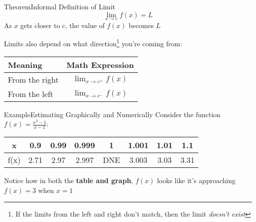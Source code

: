 \documentclass{MathNotes}
\newenvironment{example}[1]{\begin{BlueBox}{Example}{#1}}{\end{BlueBox}}
\newenvironment{theorem}[1]{\begin{GrayBox}{Theorem}{#1}}{\end{GrayBox}}
\begin{document}
\begin{multicols}{2}[]
\begin{theorem}{Informal Definition of Limit}
    \[\lim_{x\to c}f(x)=L\] 
    As $x$ gets closer to $c$, the value of $f(x)$ becomes $L$
\end{theorem}


Limits also depend on what direction\footnote{If the limits from the left and
right don't match, then the limit \textit{doesn't exist}} you're coming from:
\begin{tabular}{ |l|c| }
    \hline
    Meaning & Math Expression\\
    \hline
    \hline
    From the right & $\lim_{x\to c^+}f(x)$ \\
    \hline
    From the left & $\lim_{x\to c^-}f(x)$ \\
    \hline
\end{tabular}
\end{multicols}

\begin{example}{Estimating Graphically and Numerically}\label{ex:1.1}
    Consider the function $f(x)=\frac{x^3-1}{x-1}$:
    \begin{center}

        \begin{tabular}{ |c||c|c|c|c|c|c|c| }
            \hline
            x    & 0.9 & 0.99 & 0.999 & 1 & 1.001 & 1.01 & 1.1\\
            \hline
            f(x) & 2.71 & 2.97 & 2.997 &DNE& 3.003 & 3.03 & 3.31 \\
            \hline
        \end{tabular}
    \end{center}

    Notice how in both the \textbf{table and graph}, $f(x)$ looks like it's
    approaching $f(x)=3$ when $x=1$
\end{example}
\end{document}
